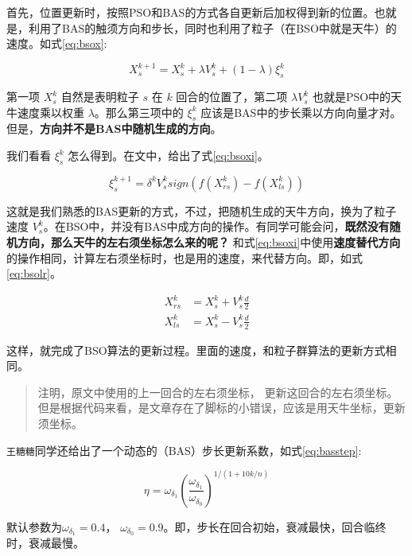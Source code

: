 \documentclass[]{ctexbook}
\theoremstyle{definition}
\theoremstyle{definition}
\theoremstyle{definition}
\theoremstyle{remark}
\begin{document}
首先，位置更新时，按照PSO和BAS的方式各自更新后加权得到新的位置。也就是，利用了BAS的触须方向和步长，同时也利用了粒子（在BSO中就是天牛）的速度。如式\eqref{eq:bsox}:

\begin{equation}
X_{s}^{k+1} = X_{s}^{k} + \lambda V_{s}^k + (1 - \lambda)\xi_{s}^k
\label{eq:bsox}
\end{equation}

第一项 \(X_{s}^{k}\) 自然是表明粒子 \(s\) 在 \(k\) 回合的位置了，第二项
\(\lambda V_{s}^k\) 也就是PSO中的天牛速度乘以权重
\(\lambda\)。那么第三项中的 \(\xi_{s}^k\)
应该是BAS中的步长乘以方向向量才对。但是，\textbf{方向并不是BAS中随机生成的方向}。

我们看看 \(\xi_s^k\) 怎么得到。在文中，给出了式\eqref{eq:bsoxi}。

\begin{equation}
\xi_s^{k+1} = \delta^kV_s^ksign(f(X_{rs}^k) - f(X_{ls}^k))
\label{eq:bsoxi}
\end{equation}

这就是我们熟悉的BAS更新的方式，不过，把随机生成的天牛方向，换为了粒子速度
\(V_s^k\)。在BSO中，并没有BAS中成方向的操作。有同学可能会问，\textbf{既然没有随机方向，那么天牛的左右须坐标怎么来的呢？}
和式\eqref{eq:bsoxi}中使用\textbf{速度替代方向}的操作相同，计算左右须坐标时，也是用的速度，来代替方向。即，如式\eqref{eq:bsolr}。

\begin{equation}
\begin{split}
X_{rs}^k&=X_{s}^k+V_s^k\frac{d}{2} \\
X_{ls}^k&=X_{s}^k-V_s^k\frac{d}{2}
\end{split}
\label{eq:bsolr}
\end{equation}

这样，就完成了BSO算法的更新过程。里面的速度，和粒子群算法的更新方式相同。

\begin{quote}
注明，原文中使用的上一回合的左右须坐标，
更新这回合的左右须坐标。但是根据代码来看，是文章存在了脚标的小错误，应该是用天牛坐标，更新须坐标。
\end{quote}

\texttt{王糖糖}同学还给出了一个动态的（BAS）步长更新系数，如式\eqref{eq:basstep}:

\begin{equation}
\eta = \omega_{\delta_1}(\frac{\omega_{\delta_1}}{\omega_{\delta_0}})^{1/(1+10k/n)}
\label{eq:basstep}
\end{equation}

默认参数为\(\omega_{\delta_1} = 0.4\)，
\(\omega_{\delta_0} = 0.9\)。即，步长在回合初始，衰减最快，回合临终时，衰减最慢。
\end{document}
